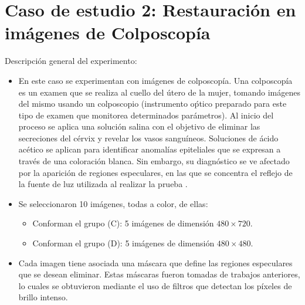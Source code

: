 \section{Caso de estudio 2: Restauraci\'on en im\'agenes de Colposcop\'ia}
Descripci\'on general del experimento:
\begin{itemize}
	\item En este caso se experimentan con im\'agenes de colposcop\'ia. Una colposcop\'ia es un examen que se realiza al cuello del \'utero de la mujer, tomando im\'agenes del mismo usando un colposcopio (instrumento o\'ptico preparado para este tipo de examen que monitorea determinados par\'ametros). Al inicio del proceso se aplica una solución salina con el objetivo de eliminar las secreciones del cérvix y revelar los vasos sanguíneos. Soluciones de ácido acético se aplican para identificar anomalías epiteliales que se expresan a través de una coloración blanca. Sin embargo, su diagnóstico se ve afectado por la aparición de regiones especulares, en las que se concentra el reflejo de la fuente de luz utilizada al realizar la prueba \cite{dgomez2018tesis}.
	
	\item Se seleccionaron 10 im\'agenes, todas a color, de ellas:
	\begin{itemize}
		\item Conforman el grupo (C): 5 im\'agenes de dimensi\'on $480 \times 720$.
		\item Conforman el grupo (D): 5 im\'agenes de dimensi\'on $480 \times 480$.
	\end{itemize}
	
	\item Cada imagen tiene asociada una m\'ascara que define las regiones especulares que se desean eliminar. Estas m\'ascaras fueron tomadas de trabajos anteriores, lo cuales se obtuvieron mediante el uso de filtros que detectan los p\'ixeles de brillo intenso.
	

\end{itemize}
